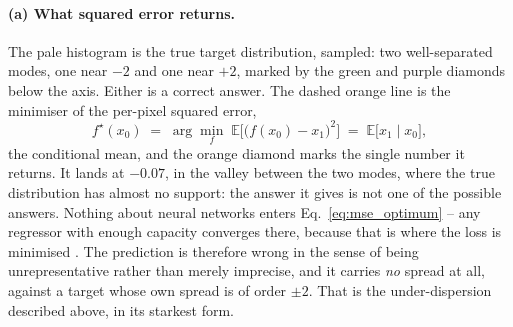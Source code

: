 \documentclass{report}
\begin{document}
\paragraph{(a) What squared error returns.} The pale histogram is the true target
distribution, sampled: two well-separated modes, one near \mbox{$-2$} and one near
\mbox{$+2$}, marked by the green and purple diamonds below the axis. Either is a correct
answer. The dashed orange line is the minimiser of the per-pixel squared error,
\begin{equation}
  f^\star(x_0) \;=\; \arg\min_f\; \mathbb{E}\big[\big(f(x_0) - x_1\big)^2\big]
  \;=\; \mathbb{E}\big[x_1 \mid x_0\big],
  \label{eq:mse_optimum}
\end{equation}
the conditional mean, and the orange diamond marks the single number it returns. It
lands at \mbox{$-0.07$}, in the valley between the two modes, where the true distribution
has almost no support: the answer it gives is not one of the possible answers. Nothing
about neural networks enters Eq.~\eqref{eq:mse_optimum} -- any regressor with enough
capacity converges there, because that is where the loss is minimised
\cite{hastie_elements_2009}. The prediction is
therefore wrong in the sense of being unrepresentative rather than merely imprecise, and
it carries \emph{no} spread at all, against a target whose own spread is of order
\mbox{$\pm 2$}. That is the under-dispersion described above, in its starkest form.
\end{document}
